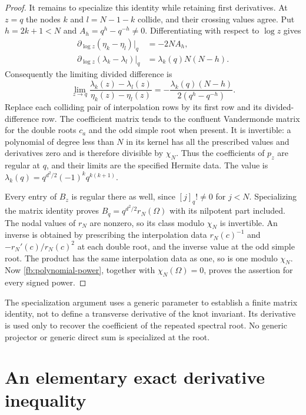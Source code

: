 \documentclass[11pt]{article}
\numberwithin{equation}{section}
\theoremstyle{definition}\newtheorem{definition}[theorem]{Definition}
\theoremstyle{remark}\newtheorem{remark}[theorem]{Remark}
\begin{document}
\begin{proof}
It remains to specialize this identity while retaining first
derivatives. At $z=q$ the nodes $k$ and $l=N-1-k$ collide, and their crossing
values agree. Put $h=2k+1<N$ and $A_h=q^h-q^{-h}\ne0$. Differentiating
with respect to $\log z$ gives
\[
\begin{split}
 \partial_{\log z}(\eta_k-\eta_l)|_q&=-2NA_h,\\
 \partial_{\log z}(\lambda_k-\lambda_l)|_q
       &=\lambda_k(q)N(N-h).
\end{split}
\]
Consequently the limiting divided difference is
\[
 \lim_{z\to q}\frac{\lambda_k(z)-\lambda_l(z)}
                         {\eta_k(z)-\eta_l(z)}
       =-\frac{\lambda_k(q)(N-h)}{2(q^h-q^{-h})}.
\]
Replace each colliding pair of interpolation rows by its first row and
its divided-difference row. The coefficient matrix tends to the
confluent Vandermonde matrix for the double roots $c_a$ and the odd
simple root when present. It is invertible: a polynomial of degree
less than $N$ in its kernel has all the prescribed values and derivatives zero and is
therefore divisible by $\chi_N$. Thus the coefficients of $p_z$
are regular at $q$, and their limits are the specified Hermite data.
The value is
$\lambda_k(q)=q^{d^2/2}(-1)^kq^{k(k+1)}$.

Every entry of $B_z$ is regular there as well, since $[j]_q!\ne0$ for
$j<N$. Specializing the matrix identity proves
$B_q=q^{d^2/2}r_N(\Omega)$ with its nilpotent part included.
The nodal values of $r_N$ are nonzero, so its class modulo $\chi_N$
is invertible. An inverse is obtained by prescribing the interpolation data
$r_N(c)^{-1}$ and $-r_N'(c)/r_N(c)^2$ at each double root, and the
inverse value at the odd simple root. The product has the same interpolation data as
one, so is one modulo $\chi_N$. Now
\eqref{fb:polynomial-power}, together with $\chi_N(\Omega)=0$,
proves the assertion for every signed power.
\end{proof}

The specialization argument uses a generic parameter to establish a
finite matrix identity, not to define a transverse derivative of the
knot invariant. Its derivative is used only to recover the coefficient
of the repeated spectral root. No generic projector or generic direct
sum is specialized at the root.

\section{An elementary exact derivative
inequality}\label{uf:sec-an-elementary-exact-derivative-inequality}
\end{document}
